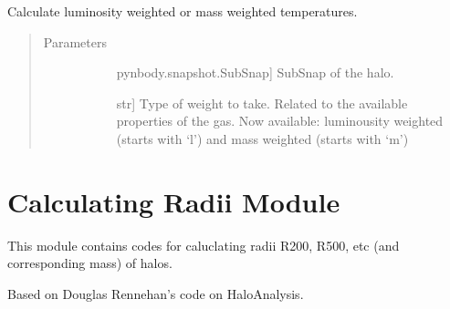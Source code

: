 \documentclass[letterpaper,10pt,english]{sphinxmanual}
\begin{document}

\begin{fulllineitems}
\label{\detokenize{X_properties:modules.X_properties.cal_tweight}}
Calculate luminosity weighted or mass weighted temperatures.
\begin{quote}\begin{description}
\item[{Parameters}] \leavevmode\begin{description}
\item[{}] \leavevmode{[}pynbody.snapshot.SubSnap{]}
SubSnap of the halo.

\item[{}] \leavevmode{[}str{]}
Type of weight to take. Related to the available properties
of the gas. Now available: luminousity weighted (starts 
with ‘l’) and mass weighted (starts with ‘m’)

\end{description}

\end{description}\end{quote}

\end{fulllineitems}



\section{Calculating Radii Module}
\label{\detokenize{calculate_R:module-modules.calculate_R}}\label{\detokenize{calculate_R:calculating-radii-module}}\label{\detokenize{calculate_R::doc}}
This module contains codes for caluclating radii R200, 
R500, etc (and corresponding mass) of halos.

Based on Douglas Rennehan’s code on HaloAnalysis.
\end{document}
